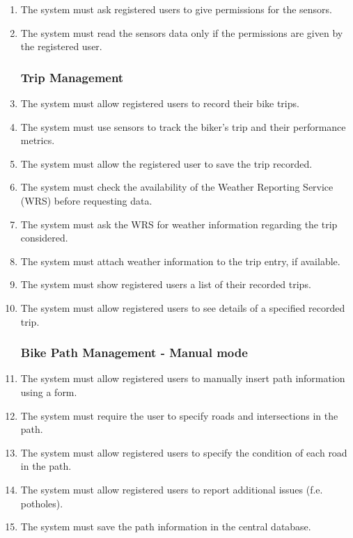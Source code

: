 \begin{enumerate}[label=•  R\arabic*:]
\subsubsection*{Permissions}
    \item The system must ask registered users to give permissions for the sensors.
    \item The system must read the sensors data only if the permissions are given by the registered user.

\subsubsection*{Trip Management}

    \item The system must allow registered users to record their bike trips.
    \item The system must use sensors to track the biker's trip and their performance metrics.
    \item The system must allow the registered user to save the trip recorded.
    \item The system must check the availability of the Weather Reporting Service (WRS) before requesting data.
    \item The system must ask the WRS for weather information regarding the trip considered.
    \item The system must attach weather information to the trip entry, if available.
    \item The system must show registered users a list of their recorded trips.
    \item The system must allow registered users to see details of a specified recorded trip.

\subsubsection*{Bike Path Management - Manual mode}

    \item The system must allow registered users to manually insert path information using a form.
    \item The system must require the user to specify roads and intersections in the path.
    \item The system must allow registered users to specify the condition of each road in the path.
    \item The system must allow registered users to report additional issues (f.e. potholes).
    \item The system must save the path information in the central database.


\end{enumerate}
